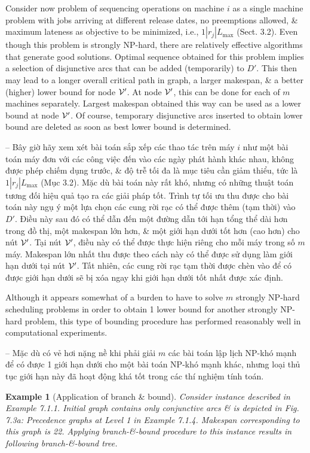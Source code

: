 \documentclass{article}
\newtheorem{example}{Example}
\begin{document}
\begin{itemize}
\begin{itemize}
        Consider now problem of sequencing operations on machine $i$ as a single machine problem with jobs arriving at different release dates, no preemptions allowed, \& maximum lateness as objective to be minimized, i.e., $1|r_j|L_{\max}$ (Sect. 3.2). Even though this problem is strongly NP-hard, there are relatively effective algorithms that generate good solutions. Optimal sequence obtained for this problem implies a selection of disjunctive arcs that can be added (temporarily) to $D'$. This then may lead to a longer overall critical path in graph, a larger makespan, \& a better (higher) lower bound for node ${\cal V}'$. At node ${\cal V}'$, this can be done for each of $m$ machines separately. Largest makespan obtained this way can be used as a lower bound at node ${\cal V}'$. Of course, temporary disjunctive arcs inserted to obtain lower bound are deleted as soon as best lower bound is determined.

        -- Bây giờ hãy xem xét bài toán sắp xếp các thao tác trên máy $i$ như một bài toán máy đơn với các công việc đến vào các ngày phát hành khác nhau, không được phép chiếm dụng trước, \& độ trễ tối đa là mục tiêu cần giảm thiểu, tức là $1|r_j|L_{\max}$ (Mục 3.2). Mặc dù bài toán này rất khó, nhưng có những thuật toán tương đối hiệu quả tạo ra các giải pháp tốt. Trình tự tối ưu thu được cho bài toán này ngụ ý một lựa chọn các cung rời rạc có thể được thêm (tạm thời) vào $D'$. Điều này sau đó có thể dẫn đến một đường dẫn tới hạn tổng thể dài hơn trong đồ thị, một makespan lớn hơn, \& một giới hạn dưới tốt hơn (cao hơn) cho nút ${\cal V}'$. Tại nút ${\cal V}'$, điều này có thể được thực hiện riêng cho mỗi máy trong số $m$ máy. Makespan lớn nhất thu được theo cách này có thể được sử dụng làm giới hạn dưới tại nút ${\cal V}'$. Tất nhiên, các cung rời rạc tạm thời được chèn vào để có được giới hạn dưới sẽ bị xóa ngay khi giới hạn dưới tốt nhất được xác định.

        Although it appears somewhat of a burden to have to solve $m$ strongly NP-hard scheduling problems in order to obtain 1 lower bound for another strongly NP-hard problem, this type of bounding procedure has performed reasonably well in computational experiments.

        -- Mặc dù có vẻ hơi nặng nề khi phải giải $m$ các bài toán lập lịch NP-khó mạnh để có được 1 giới hạn dưới cho một bài toán NP-khó mạnh khác, nhưng loại thủ tục giới hạn này đã hoạt động khá tốt trong các thí nghiệm tính toán.

        \begin{example}[Application of branch \& bound]
            Consider instance described in Example 7.1.1. Initial graph contains only conjunctive arcs \& is depicted in {\sf Fig. 7.3a: Precedence graphs at Level 1 in Example 7.1.4}. Makespan corresponding to this graph is 22. Applying branch-\&-bound procedure to this instance results in following branch-\&-bound tree.


\end{example}
\end{itemize}
\end{itemize}
\end{document}
